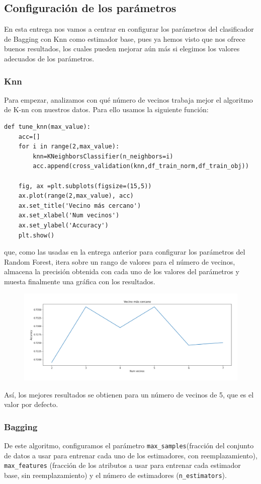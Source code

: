 \documentclass[a4paper,11pt]{article}
\begin{document}
\subsection{Configuración de los parámetros}

En esta entrega nos vamos a centrar en configurar los parámetros del clasificador de Bagging con Knn como estimador base, pues ya hemos visto que nos ofrece buenos resultados, los cuales pueden mejorar aún más si elegimos los valores adecuados de los parámetros. 
\subsubsection{Knn}
Para empezar, analizamos con qué número de vecinos trabaja mejor el algoritmo de K-nn con nuestros datos. Para ello usamos la siguiente función:

\begin{verbatim}
def tune_knn(max_value):
	acc=[]
	for i in range(2,max_value):
		knn=KNeighborsClassifier(n_neighbors=i)
		acc.append(cross_validation(knn,df_train_norm,df_train_obj))
	
	fig, ax =plt.subplots(figsize=(15,5))
	ax.plot(range(2,max_value), acc)
	ax.set_title('Vecino más cercano')
	ax.set_xlabel('Num vecinos')
	ax.set_ylabel('Accuracy')
	plt.show()
\end{verbatim} 
que, como las usadas en la entrega anterior para configurar los parámetros del Random Forest, itera sobre un rango de valores para el número de vecinos, almacena la precisión obtenida con cada uno de los valores del parámetros y muesta finalmente una gráfica con los resultados.
\begin{figure}[H]
	\centering
	\includegraphics[width=0.8\linewidth]{img/knn}
	\caption{}
	\label{fig:knn}
\end{figure}

Así, los mejores resultados se obtienen para un número de vecinos de 5, que es el valor por defecto. 
\subsubsection{Bagging}
 De este algoritmo, configuramos el parámetro \texttt{max_samples}(fracción del conjunto de datos a usar para entrenar cada uno de los estimadores, con reemplazamiento), \texttt{max_features} (fracción de los atributos a usar para entrenar cada estimador base, sin reemplazamiento) y el número de estimadores (\texttt{n_estimators}). 
 
\end{document}
